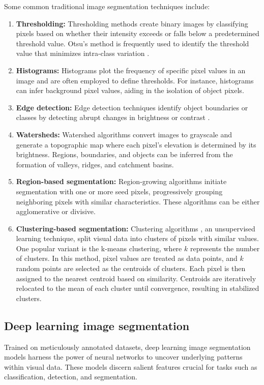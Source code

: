 Some common traditional image segmentation techniques include:
\begin{enumerate}
  \item \textbf{Thresholding:} Thresholding methods create binary images by classifying pixels based on whether
  their intensity exceeds or falls below a predetermined threshold value. Otsu's method is frequently used to identify the threshold value that minimizes intra-class variation \cite{otsu1979}.
  \item \textbf{Histograms:} Histograms plot the frequency of specific pixel values in an image and are often employed to define thresholds. For instance, histograms can infer background pixel values, aiding in the isolation of object pixels.
  \item \textbf{Edge detection:} Edge detection techniques identify object boundaries or classes by detecting abrupt changes in brightness or contrast \cite{Edgedet1986}.
  \item \textbf{Watersheds:} Watershed algorithms \cite{Watershed1991} convert images to grayscale and generate a topographic map where each pixel's elevation is determined by its brightness. Regions, boundaries, and objects can be inferred from the formation of valleys, ridges, and catchment basins.
  \item \textbf{Region-based segmentation:} Region-growing algorithms \cite{RCNN2016} initiate segmentation with one or more seed pixels, progressively grouping neighboring pixels with similar characteristics. These algorithms can be either agglomerative or divisive.
  \item \textbf{Clustering-based segmentation:} Clustering algorithms \cite{ClusteringSeg1979}, an unsupervised
  learning technique, split visual data into clusters of pixels with similar values. One popular variant is the k-means
  clustering, where $k$ represents the number of clusters. In this method, pixel values are treated as data points, and $k$ random points are selected as the centroids of clusters. Each pixel is then assigned to the nearest centroid based on similarity. Centroids are iteratively relocated to the mean of each cluster until convergence, resulting in stabilized clusters.
\end{enumerate}

\subsection{Deep learning image segmentation}
Trained on meticulously annotated datasets, deep learning image segmentation models harness the power of neural networks to uncover underlying patterns within visual data. These models discern salient features crucial for tasks such as classification, detection, and segmentation.

